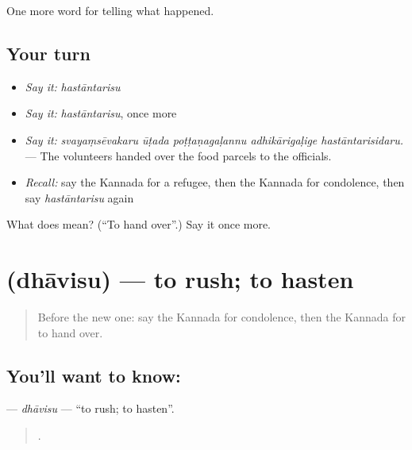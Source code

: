 \begin{grammarlens}[title={What you've built}]
One more word for telling what happened.
\end{grammarlens}

\subsection*{Your turn}
\begin{itemize}
\raggedright
  \item \emph{Say it:} \emph{hastāntarisu}
  \item \emph{Say it:} \emph{hastāntarisu}, once more
  \item \emph{Say it:} \emph{svayaṃsēvakaru ūṭada poṭṭaṇagaḷannu adhikārigaḷige hastāntarisidaru.} — The volunteers handed over the food parcels to the officials.
  \item \emph{Recall:} say the Kannada for a refugee, then the Kannada for condolence, then say \emph{hastāntarisu} again
\end{itemize}

\begin{tcolorbox}[breakable,colback=teal!4,colframe=teal!35!black,title={Before you move on}]
What does  mean? (\textquotedblleft{}To hand over\textquotedblright{}.) Say it once more.
\end{tcolorbox}
\section[\texorpdfstring{\kn{ಧಾವಿಸು} (dhāvisu)}{ಧಾವಿಸು (dhāvisu)}]{ (dhāvisu) — to rush; to hasten}

\label{lesson:KA-C375-dhavisu}



\begin{quote}
Before the new one: say the Kannada for condolence, then the Kannada for to hand over.
\end{quote}

\subsection*{You'll want to know: }
\textbf{} — \emph{dhāvisu} — \textquotedblleft{}to rush; to hasten\textquotedblright{}.

\begin{quote}
    .
\end{quote}

